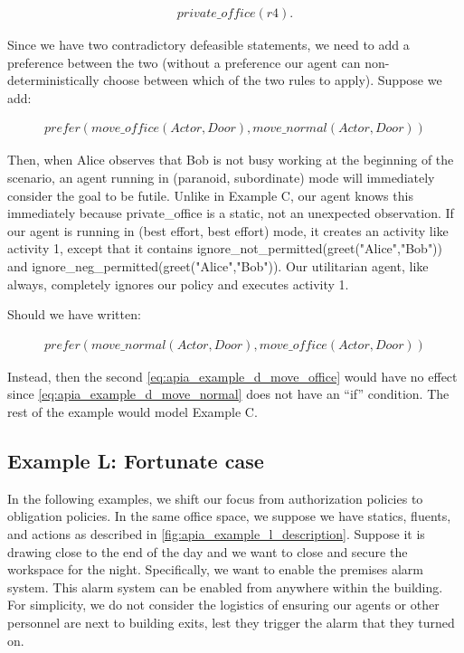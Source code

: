 \begin{equation}
\begin{split}
private\_office(r4).
\end{split}
\end{equation}

Since we have two contradictory defeasible statements, we need to add a preference between the two (without a preference our agent can non-deterministically choose between which of the two rules to apply).
Suppose we add:

\begin{equation}
\begin{split}
prefer(move\_office(Actor, Door), move\_normal(Actor, Door))
\end{split}
\end{equation}

Then, when Alice observes that Bob is not busy working at the beginning of the scenario, an agent running in (paranoid, subordinate) mode will immediately consider the goal to be futile.
Unlike in Example C, our agent knows this immediately because private\_office is a static, not an unexpected observation.
If our agent is running in (best effort, best effort) mode, it creates an activity like activity 1, except that it contains ignore\_not\_permitted(greet("Alice","Bob")) and ignore\_neg\_permitted(greet("Alice","Bob")).
Our utilitarian agent, like always, completely ignores our policy and executes activity 1.

Should we have written:

\begin{equation}
\begin{split}
prefer(move\_normal(Actor, Door), move\_office(Actor, Door))
\end{split}
\end{equation}

Instead, then the second \cref{eq:apia_example_d_move_office} would have no effect since \cref{eq:apia_example_d_move_normal} does not have an ``if'' condition.
The rest of the example would model Example C.

\subsection{Example L: Fortunate case}

In the following examples, we shift our focus from authorization policies to obligation policies.
In the same office space, we suppose we have statics, fluents, and actions as described in \cref{fig:apia_example_l_description}.
Suppose it is drawing close to the end of the day and we want to close and secure the workspace for the night.
Specifically, we want to enable the premises alarm system.
This alarm system can be enabled from anywhere within the building.
For simplicity, we do not consider the logistics of ensuring our agents or other personnel are next to building exits, lest they trigger the alarm that they turned on.

